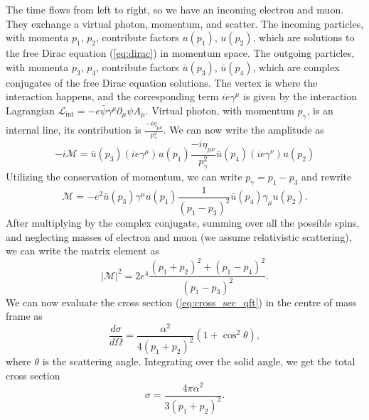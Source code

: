 The time flows from left to right, so we have an incoming electron and muon. 
They exchange a virtual photon, momentum, and scatter.
The incoming particles, with momenta $p_1$, $p_2$, contribute factors $u(p_1)$, $u(p_2)$, which are solutions to the free Dirac equation (\ref{eq:dirac}) in momentum space. 
The outgoing particles, with momenta $p_3$, $p_4$, contribute factors $\bar{u}(p_3)$, $\bar{u}(p_4)$, which are complex conjugates of the free Dirac equation solutions.
The vertex is where the interaction happens, and the corresponding term $ie\gamma^\mu$ is given by the interaction Lagrangian $\mathcal{L}_{\text{int}} = - e \bar{\psi} \gamma^\mu \partial_\mu \psi A_\mu$.
Virtual photon, with momentum $p_{\gamma}$, is an internal line, its contribution is $\frac{-i\eta_{\mu \nu}}{p_{\gamma}^2}$.
We can now write the amplitude as 
\begin{equation}
    \label{eq:e_mu_amp}
    -i\mathcal{M} = \bar{u}(p_3) (ie\gamma^\mu) u(p_1) \frac{-i\eta_{\mu \nu}}{p_{\gamma}^2} \bar{u}(p_4) (ie\gamma^\nu) u(p_2)
\end{equation}
Utilizing the conservation of momentum, we can write $p_{\gamma} = p_1 - p_3$ and rewrite
\begin{equation}
    \label{eq:e_mu_amp_2}
    \mathcal{M} = -e^2 \bar{u}(p_3) \gamma^\mu u(p_1) \frac{1}{(p_1 - p_3)^2} \bar{u}(p_4) \gamma_\mu u(p_2).
\end{equation}
After multiplying by the complex conjugate, summing over all the possible spins, and neglecting masses of electron and muon (we assume relativistic scattering), we can write the matrix element as
\begin{equation}
    |\mathcal{M}|^2 = 2e^4\frac{(p_1 + p_2)^2 + (p_1 - p_4)^2}{(p_1 - p_3)^2}.
\end{equation}
We can now evaluate the cross section (\ref{eq:cross_sec_qft}) in the centre of mass frame as
\begin{equation}
    \label{eq:cross_sec_qft_2}
    \frac{d\sigma}{d\Omega} = \frac{\alpha^2}{4(p_1 + p_2)^2} (1+\cos^2{\theta}),
\end{equation}
where $\theta$ is the scattering angle.
Integrating over the solid angle, we get the total cross section
\begin{equation}
    \sigma =  \frac{4\pi\alpha^2}{3(p_1 + p_2)^2}.
\end{equation}

